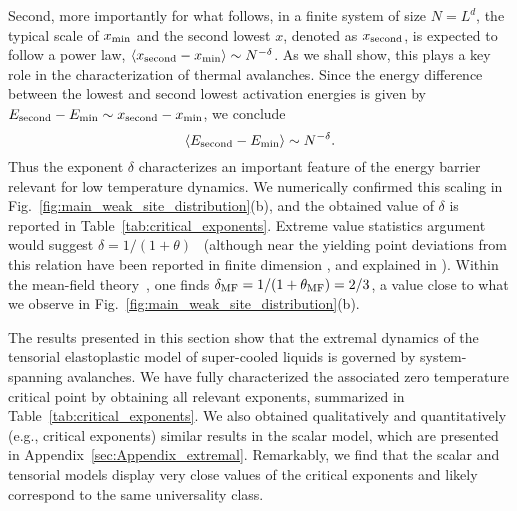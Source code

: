 \documentclass[pre,twocolumn,superscriptaddress,tightenlines,showpacs,longbibliography,floatfix,footinbib]{revtex4-1}
\newcommand{\MO}[1]{{\bf \color{red} $^{MO}$ #1}}
\begin{document}
Second, more importantly for what follows, in a finite system of size $N=L^d$, the typical scale of $x_{\rm min}$ and the second lowest $x$, denoted as $x_{\rm second}$, is expected to follow
a power law, $\langle x_{\rm second}-x_{\rm min} \rangle \sim N^{-\delta}$. As we shall show, this plays a key role in the characterization of thermal avalanches.
Since the energy difference between the lowest and second lowest activation energies is given by $E_{\rm second}-E_{\rm min} \sim x_{\rm second}-x_{\rm min}$, we conclude
\begin{equation}
\langle E_{\rm second}-E_{\rm min} \rangle \sim N^{-\delta}.
\label{eq:delta_scaling}
\end{equation}
Thus the exponent $\delta$ characterizes an important feature of the energy barrier relevant for low temperature dynamics.
We numerically confirmed this scaling in Fig.~\ref{fig:main_weak_site_distribution}(b), and the obtained value of $\delta$ is reported in Table~\ref{tab:critical_exponents}.
Extreme value statistics argument would suggest $\delta=1/(1+\theta)$~\cite{Lin2014b} (although near the yielding point deviations from this relation have been reported in finite dimension \cite{ferrero2021properties}, and explained in \cite{korchinski2021signatures}).   
Within the mean-field theory~\cite{lin2016mean},  one finds $\delta_{\rm MF}=1/(1+\theta_{\rm MF})=2/3$, a value close to what we observe in Fig.~\ref{fig:main_weak_site_distribution}(b). 

 

The results presented in this section show that the extremal dynamics of the tensorial elastoplastic model of super-cooled liquids is governed by system-spanning avalanches. We have fully characterized the associated zero temperature critical point by obtaining all relevant exponents, summarized in Table~\ref{tab:critical_exponents}.
We also obtained qualitatively and quantitatively (e.g., critical exponents) similar results in the scalar model, which are presented in Appendix~\ref{sec:Appendix_extremal}.
Remarkably, we find that the scalar and tensorial models display very close values of the critical exponents and likely correspond to the same universality class. 
\end{document}
